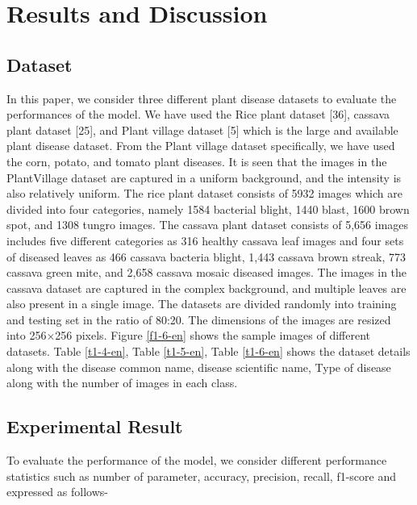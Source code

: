 
\section{Results and Discussion} \label{s4-en}
\subsection{Dataset}
In this paper, we consider three different plant disease datasets to evaluate the performances of the model. We have used the Rice plant dataset [36], cassava plant dataset [25], and Plant village dataset [5] which is the large and available plant disease dataset. From the Plant village dataset specifically, we have used the corn, potato, and tomato plant diseases. It is seen that the images in the PlantVillage dataset are captured in a uniform background, and the intensity is also relatively uniform. The rice plant dataset consists of 5932 images which are divided into four categories, namely 1584 bacterial blight, 1440 blast, 1600 brown spot, and 1308 tungro images. The cassava plant dataset consists of 5,656 images includes five different categories as 316 healthy cassava leaf images and four sets of diseased leaves as 466 cassava bacteria blight, 1,443 cassava brown streak, 773 cassava green mite, and 2,658 cassava mosaic diseased images. The images in the cassava dataset are captured in the complex background, and multiple leaves are also present in a single image. The datasets are divided randomly into training and testing set in the ratio of 80:20. The dimensions of the images are resized into 256×256 pixels. Figure \ref{f1-6-en} shows the sample images of different datasets. Table \ref{t1-4-en}, Table \ref{t1-5-en}, Table \ref{t1-6-en} shows the dataset details along with the disease common name, disease scientific name, Type of disease along with the number of images in each class.





\subsection{Experimental Result}
To evaluate the performance of the model, we consider different performance statistics such as number of parameter, accuracy, precision, recall, f1-score and expressed as follows-

